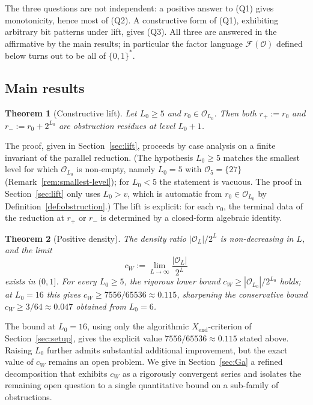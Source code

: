 \documentclass[11pt,reqno]{amsart}
\theoremstyle{plain}
\newtheorem{theorem}{Theorem}[section]
\theoremstyle{definition}
\theoremstyle{remark}
\newcommand{\Obs}{\mathcal{O}}
\newcommand{\Fac}{\mathcal{F}}
\newcommand{\Xend}{X_{\mathrm{end}}}
\begin{document}
The three questions are not independent: a positive answer to (Q1) gives
monotonicity, hence most of (Q2). A constructive form of (Q1), exhibiting
arbitrary bit patterns under lift, gives (Q3). All three are answered in
the affirmative by the main results; in particular the factor language
$\Fac(\Obs)$ defined below turns out to be all of $\{0,1\}^*$.

\subsection{Main results}

\begin{theorem}[Constructive lift]
\label{thm:lift-intro}
Let $L_0 \ge 5$ and $r_0 \in \Obs_{L_0}$. Then both $r_+ := r_0$ and
$r_- := r_0 + 2^{L_0}$ are obstruction residues at level $L_0 + 1$.
\end{theorem}

The proof, given in Section~\ref{sec:lift}, proceeds by case analysis on a
finite invariant of the parallel reduction. (The hypothesis $L_0 \ge 5$
matches the smallest level for which $\Obs_{L_0}$ is non-empty, namely
$L_0 = 5$ with $\Obs_5 = \{27\}$ (Remark~\ref{rem:smallest-level}); for
$L_0 < 5$ the statement is vacuous. The proof in Section~\ref{sec:lift}
only uses $L_0 > v$, which is automatic from $r_0 \in \Obs_{L_0}$ by
Definition~\ref{def:obstruction}.) The lift is explicit: for each $r_0$,
the terminal data of the reduction at $r_+$ or $r_-$ is determined by a
closed-form algebraic identity.

\begin{theorem}[Positive density]
\label{thm:density-intro}
The density ratio $|\Obs_L|/2^L$ is non-decreasing in $L$, and the limit
\[
c_W := \lim_{L \to \infty} \frac{|\Obs_L|}{2^L}
\]
exists in $(0, 1]$. For every $L_0 \ge 5$, the rigorous lower bound
$c_W \ge |\Obs_{L_0}|/2^{L_0}$ holds; at $L_0 = 16$ this gives
$c_W \ge 7556/65536 \approx 0.115$, sharpening the conservative
bound $c_W \ge 3/64 \approx 0.047$ obtained from $L_0 = 6$.
\end{theorem}

The bound at $L_0 = 16$, using only the algorithmic
$\Xend$-criterion of Section~\ref{sec:setup}, gives the explicit value
$7556/65536 \approx 0.115$ stated above. Raising $L_0$ further admits
substantial additional improvement, but the exact value of $c_W$ remains
an open problem. We give in
Section~\ref{sec:Ga} a refined decomposition that exhibits $c_W$ as a
rigorously convergent series and isolates the remaining open question to a
single quantitative bound on a sub-family of obstructions.
\end{document}
